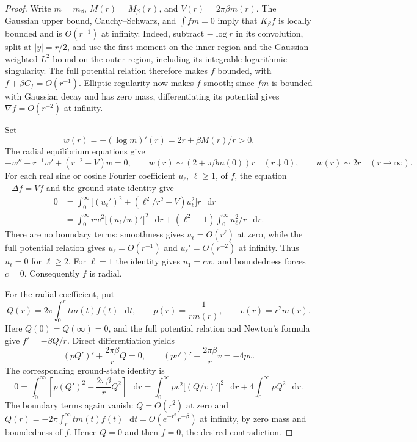 \documentclass[11pt,reqno]{amsart}
\numberwithin{equation}{section}
\theoremstyle{plain}
\theoremstyle{definition}
\newcommand{\dd}{\mathop{}\!\mathrm d}
\newcommand{\be}{\beta}
\begin{document}
\begin{proof}
Write $m=m_\be$, $M(r)=M_\be(r)$, and $V(r)=2\pi\be m(r)$.
The Gaussian upper bound, Cauchy--Schwarz, and $\int fm=0$ imply that
$K_\be f$ is locally bounded and is $O(r^{-1})$ at infinity.
Indeed, subtract $-\log r$ in its convolution, split at $|y|=r/2$,
and use the first moment on the inner region and the Gaussian-weighted
$L^2$ bound on the outer region, including its integrable logarithmic
singularity.  The full potential relation therefore makes $f$ bounded,
with $f+\be C_f=O(r^{-1})$.  Elliptic regularity now makes $f$ smooth;
since $fm$ is bounded with Gaussian decay and has zero mass,
differentiating its potential gives $\nabla f=O(r^{-2})$ at infinity.

Set
\begin{equation}
 w(r)=-(\log m)'(r)=2r+\be M(r)/r>0.
\end{equation}
The radial equilibrium equations give
\begin{equation}
 -w''-r^{-1}w'+(r^{-2}-V)w=0,
 \qquad w(r)\sim(2+\pi\be m(0))r\quad(r\downarrow0),
 \qquad w(r)\sim2r\quad(r\to\infty).
\end{equation}
For each real sine or cosine Fourier coefficient $u_\ell$, $\ell\geq1$,
of $f$, the equation $-\Delta f=Vf$ and the ground-state identity give
\begin{equation}
 \begin{split}
 0&=\int_0^\infty\bigl[(u_\ell')^2+
              (\ell^2/r^2-V)u_\ell^2\bigr]r\,\dd r\\
  &=\int_0^\infty r w^2\bigl[(u_\ell/w)'\bigr]^2\,\dd r
       +(\ell^2-1)\int_0^\infty u_\ell^2/r\,\dd r.
 \end{split}
\end{equation}
There are no boundary terms: smoothness gives $u_\ell=O(r^\ell)$
at zero, while the full potential relation gives $u_\ell=O(r^{-1})$
and $u_\ell'=O(r^{-2})$ at infinity.  Thus $u_\ell=0$ for $\ell\geq2$.
For $\ell=1$ the identity gives $u_1=cw$, and boundedness forces $c=0$.
Consequently $f$ is radial.

For the radial coefficient, put
\begin{equation}
 Q(r)=2\pi\int_0^r t m(t)f(t)\,\dd t,
 \qquad p(r)=\frac1{r m(r)},\qquad v(r)=r^2m(r).
\end{equation}
Here $Q(0)=Q(\infty)=0$, and the full potential relation and Newton's
formula give $f'=-\be Q/r$.  Direct differentiation yields
\begin{equation}
 (pQ')'+\frac{2\pi\be}{r}Q=0,
 \qquad
 (pv')'+\frac{2\pi\be}{r}v=-4pv.
\end{equation}
The corresponding ground-state identity is
\begin{equation}
 0=\int_0^\infty
       \left[p(Q')^2-\frac{2\pi\be}{r}Q^2\right]\,\dd r
   =\int_0^\infty pv^2\bigl[(Q/v)'\bigr]^2\,\dd r
       +4\int_0^\infty pQ^2\,\dd r.
\end{equation}
The boundary terms again vanish: $Q=O(r^2)$ at zero and
$Q(r)=-2\pi\int_r^\infty t m(t)f(t)\,\dd t
 =O(e^{-r^2}r^{-\be})$ at infinity, by zero mass and boundedness of $f$.
Hence $Q=0$ and then $f=0$, the desired contradiction.
\end{proof}
\end{document}
